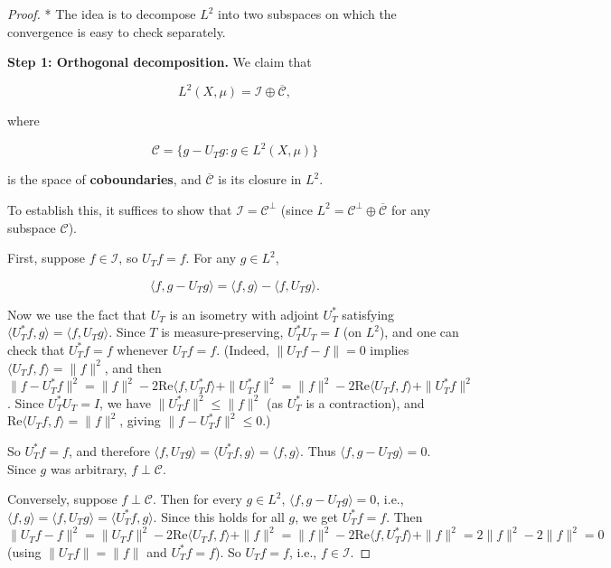 \begin{proof}
* The idea is to decompose $L^2$ into two subspaces on which the convergence is easy to check separately.

\textbf{Step 1: Orthogonal decomposition.} We claim that

\[
L^2(X, \mu) = \mathcal{I} \oplus \overline{\mathcal{C}},
\]

where

\[
\mathcal{C} = \{ g - U_T g : g \in L^2(X, \mu) \}
\]

is the space of \textbf{coboundaries}, and $\overline{\mathcal{C}}$ is its closure in $L^2$.

To establish this, it suffices to show that $\mathcal{I} = \mathcal{C}^\perp$ (since $L^2 = \mathcal{C}^\perp \oplus \overline{\mathcal{C}}$ for any subspace $\mathcal{C}$).

First, suppose $f \in \mathcal{I}$, so $U_T f = f$. For any $g \in L^2$,

\[
\langle f, g - U_T g \rangle = \langle f, g \rangle - \langle f, U_T g \rangle.
\]

Now we use the fact that $U_T$ is an isometry with adjoint $U_T^*$ satisfying $\langle U_T^* f, g \rangle = \langle f, U_T g \rangle$. Since $T$ is measure-preserving, $U_T^* U_T = I$ (on $L^2$), and one can check that $U_T^* f = f$ whenever $U_T f = f$. (Indeed, $\|U_T f - f\| = 0$ implies $\langle U_T f, f \rangle = \|f\|^2$, and then $\|f - U_T^* f\|^2 = \|f\|^2 - 2\text{Re}\langle f, U_T^* f\rangle + \|U_T^* f\|^2 = \|f\|^2 - 2\text{Re}\langle U_T f, f\rangle + \|U_T^* f\|^2$. Since $U_T^* U_T = I$, we have $\|U_T^* f\|^2 \leq \|f\|^2$ (as $U_T^*$ is a contraction), and $\text{Re}\langle U_T f, f\rangle = \|f\|^2$, giving $\|f - U_T^* f\|^2 \leq 0$.)

So $U_T^* f = f$, and therefore $\langle f, U_T g \rangle = \langle U_T^* f, g \rangle = \langle f, g \rangle$. Thus $\langle f, g - U_T g \rangle = 0$. Since $g$ was arbitrary, $f \perp \mathcal{C}$.

Conversely, suppose $f \perp \mathcal{C}$. Then for every $g \in L^2$, $\langle f, g - U_T g \rangle = 0$, i.e., $\langle f, g \rangle = \langle f, U_T g \rangle = \langle U_T^* f, g \rangle$. Since this holds for all $g$, we get $U_T^* f = f$. Then $\|U_T f - f\|^2 = \|U_T f\|^2 - 2\text{Re}\langle U_T f, f\rangle + \|f\|^2 = \|f\|^2 - 2\text{Re}\langle f, U_T^* f\rangle + \|f\|^2 = 2\|f\|^2 - 2\|f\|^2 = 0$ (using $\|U_T f\| = \|f\|$ and $U_T^* f = f$). So $U_T f = f$, i.e., $f \in \mathcal{I}$.


\end{proof}
